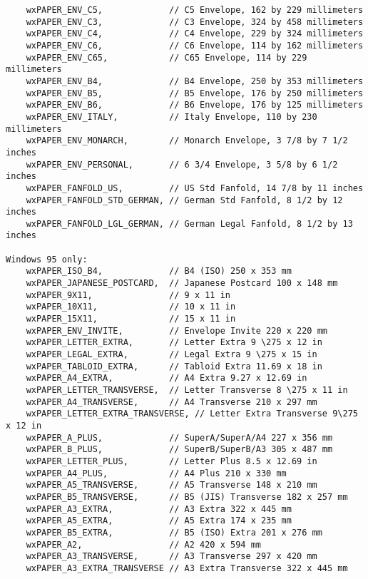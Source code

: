 {\begin{verbatim}
    wxPAPER_ENV_C5,             // C5 Envelope, 162 by 229 millimeters
    wxPAPER_ENV_C3,             // C3 Envelope, 324 by 458 millimeters
    wxPAPER_ENV_C4,             // C4 Envelope, 229 by 324 millimeters
    wxPAPER_ENV_C6,             // C6 Envelope, 114 by 162 millimeters
    wxPAPER_ENV_C65,            // C65 Envelope, 114 by 229 millimeters
    wxPAPER_ENV_B4,             // B4 Envelope, 250 by 353 millimeters
    wxPAPER_ENV_B5,             // B5 Envelope, 176 by 250 millimeters
    wxPAPER_ENV_B6,             // B6 Envelope, 176 by 125 millimeters
    wxPAPER_ENV_ITALY,          // Italy Envelope, 110 by 230 millimeters
    wxPAPER_ENV_MONARCH,        // Monarch Envelope, 3 7/8 by 7 1/2 inches
    wxPAPER_ENV_PERSONAL,       // 6 3/4 Envelope, 3 5/8 by 6 1/2 inches
    wxPAPER_FANFOLD_US,         // US Std Fanfold, 14 7/8 by 11 inches
    wxPAPER_FANFOLD_STD_GERMAN, // German Std Fanfold, 8 1/2 by 12 inches
    wxPAPER_FANFOLD_LGL_GERMAN, // German Legal Fanfold, 8 1/2 by 13 inches

Windows 95 only:
    wxPAPER_ISO_B4,             // B4 (ISO) 250 x 353 mm
    wxPAPER_JAPANESE_POSTCARD,  // Japanese Postcard 100 x 148 mm
    wxPAPER_9X11,               // 9 x 11 in
    wxPAPER_10X11,              // 10 x 11 in
    wxPAPER_15X11,              // 15 x 11 in
    wxPAPER_ENV_INVITE,         // Envelope Invite 220 x 220 mm
    wxPAPER_LETTER_EXTRA,       // Letter Extra 9 \275 x 12 in
    wxPAPER_LEGAL_EXTRA,        // Legal Extra 9 \275 x 15 in
    wxPAPER_TABLOID_EXTRA,      // Tabloid Extra 11.69 x 18 in
    wxPAPER_A4_EXTRA,           // A4 Extra 9.27 x 12.69 in
    wxPAPER_LETTER_TRANSVERSE,  // Letter Transverse 8 \275 x 11 in
    wxPAPER_A4_TRANSVERSE,      // A4 Transverse 210 x 297 mm
    wxPAPER_LETTER_EXTRA_TRANSVERSE, // Letter Extra Transverse 9\275 x 12 in
    wxPAPER_A_PLUS,             // SuperA/SuperA/A4 227 x 356 mm
    wxPAPER_B_PLUS,             // SuperB/SuperB/A3 305 x 487 mm
    wxPAPER_LETTER_PLUS,        // Letter Plus 8.5 x 12.69 in
    wxPAPER_A4_PLUS,            // A4 Plus 210 x 330 mm
    wxPAPER_A5_TRANSVERSE,      // A5 Transverse 148 x 210 mm
    wxPAPER_B5_TRANSVERSE,      // B5 (JIS) Transverse 182 x 257 mm
    wxPAPER_A3_EXTRA,           // A3 Extra 322 x 445 mm
    wxPAPER_A5_EXTRA,           // A5 Extra 174 x 235 mm
    wxPAPER_B5_EXTRA,           // B5 (ISO) Extra 201 x 276 mm
    wxPAPER_A2,                 // A2 420 x 594 mm
    wxPAPER_A3_TRANSVERSE,      // A3 Transverse 297 x 420 mm
    wxPAPER_A3_EXTRA_TRANSVERSE // A3 Extra Transverse 322 x 445 mm
\end{verbatim}
}

